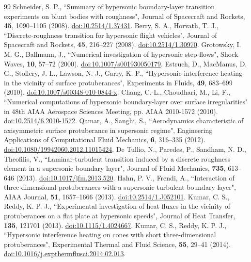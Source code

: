 \documentclass[aip,pof,preprint,notitlepage,floatfix,amsmath,amssymb]{revtex4-2}
\begin{document}
\begin{thebibliography}{99}
 Schneider, S. P., ``Summary of hypersonic boundary-layer transition experiments on blunt bodies with roughness", Journal of Spacecraft and Rockets, \textbf{45}, 1090--1105 (2008). \href{https://doi.org/10.2514/1.37431}{doi:10.2514/1.37431}.
 Berry, S. A., Horvath, T. J., ``Discrete-roughness transition for hypersonic flight vehicles", Journal of Spacecraft and Rockets, \textbf{45}, 216--227 (2008). \href{https://doi.org/10.2514/1.30970}{doi:10.2514/1.30970}.
 Grotowsky, I. M. G., Ballmann, J., ``Numerical investigation of hypersonic step-flows", Shock Waves, \textbf{10}, 57--72 (2000). \href{https://doi.org/10.1007/s001930050179}{doi:10.1007/s001930050179}.
 Estruch, D., MacManus, D. G., Stollery, J. L., Lawson, N. J., Garry, K. P., ``Hypersonic interference heating in the vicinity of surface protuberances", Experiments in Fluids, \textbf{49}, 683--699 (2010). \href{https://doi.org/10.1007/s00348-010-0844-x}{doi:10.1007/s00348-010-0844-x}.
 Chang, C.-L., Choudhari, M., Li, F., ``Numerical computations of hypersonic boundary-layer over surface irregularities" in 48th AIAA Aerospace Sciences Meeting, pp. AIAA 2010-1572 (2010). \href{https://doi.org/10.2514/6.2010-1572}{doi:10.2514/6.2010-1572}.
 Qamar, A., Sanghi, S., ``Aerodynamics characteristic of axisymmetric surface protuberance in supersonic regime", Engineering Applications of Computational Fluid Mechanics, \textbf{6}, 316--335 (2012). \href{https://doi.org/10.1080/19942060.2012.11015424}{doi:10.1080/19942060.2012.11015424}.
 De Tullio, N., Paredes, P., Sandham, N. D., Theofilis, V., ``Laminar-turbulent transition induced by a discrete roughness element in a supersonic boundary layer", Journal of Fluid Mechanics, \textbf{735}, 613--646 (2013). \href{https://doi.org/10.1017/jfm.2013.520}{doi:10.1017/jfm.2013.520}.
 Hahn, P. V., Frendi, A., ``Interaction of three-dimensional protuberances with a supersonic turbulent boundary layer", AIAA Journal, \textbf{51}, 1657--1666 (2013). \href{https://doi.org/10.2514/1.J052101}{doi:10.2514/1.J052101}.
 Kumar, C. S., Reddy, K. P. J., ``Experimental investigation of heat fluxes in the vicinity of protuberances on a flat plate at hypersonic speeds", Journal of Heat Transfer, \textbf{135}, 121701 (2013). \href{https://doi.org/10.1115/1.4024667}{doi:10.1115/1.4024667}.
 Kumar, C. S., Reddy, K. P. J., ``Hypersonic interference heating on cones with short three-dimensional protuberances", Experimental Thermal and Fluid Science, \textbf{55}, 29--41 (2014). \href{https://doi.org/10.1016/j.expthermflusci.2014.02.013}{doi:10.1016/j.expthermflusci.2014.02.013}.

\end{thebibliography}
\end{document}
